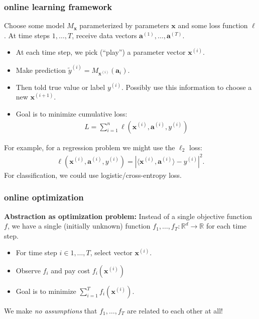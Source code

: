 \documentclass[compress]{beamer}
\newcommand{\bv}[1]{\mathbf{#1}}
\newcommand{\R}{\mathbb{R}}
\begin{document}
\begin{frame}
	\frametitle{online learning framework}
	Choose some model $M_\bv{x}$ parameterized by parameters $\bv{x}$ and some loss function $\ell$. 
	At time steps $1,\ldots, T$, receive data vectors $\bv{a}^{(1)}, \ldots, \bv{a}^{(T)}$. 
	\begin{itemize}
		\item At each time step, we pick (``play'') a parameter vector $\bv{x}^{(i)}$.
		\item Make prediction $\tilde{y}^{(i)} = M_{\bv{x}^{(i)}}(\bv{a}_i)$.
		\item Then told true value or label $y^{(i)}$. Possibly use this information to choose a new $\bv{x}^{(i+1)}$.
		\item Goal is to minimize cumulative loss:
		\begin{align*}
			L = \sum_{i=1}^n \ell(\bv{x}^{(i)}, \bv{a}^{(i)}, y^{(i)})
		\end{align*} 
	\end{itemize}
	For example, for a regression problem we might use the $\ell_2$ loss:
	\begin{align*}
		\ell(\bv{x}^{(i)}, \bv{a}^{(i)}, y^{(i)}) = \left|\langle\bv{x}^{(i)},\bv{a}^{(i)}\rangle - y^{(i)}\right|^2. 
	\end{align*}
For classification, we could use logistic/cross-entropy loss. 
\end{frame}

\begin{frame}
	\frametitle{online optimization}
	\textbf{Abstraction as optimization problem:} Instead of a single objective function $f$, we have a single (initially unknown) function $f_1, \ldots, f_T: \R^d \rightarrow \R$ for each time step. 
	\begin{itemize}
		\item For time step $i\in 1,\ldots, T$, select vector $\bv{x}^{(i)}$.
		\item Observe $f_i$ and pay cost $f_i(\bv{x}^{(i)})$
		\item Goal is to minimize $\sum_{i=1}^T f_i(\bv{x}^{(i)})$. 
	\end{itemize}

	\begin{center}
		We make \emph{no assumptions} that $f_1, \ldots, f_T$ are related to each other at all!
	\end{center}
\end{frame}
\end{document}
